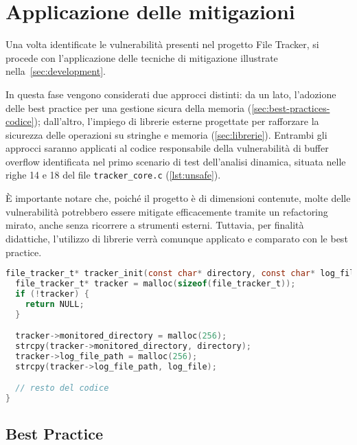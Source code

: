 \section{Applicazione delle mitigazioni}
\label{sec:mitigation_techniques}

Una volta identificate le vulnerabilità presenti nel progetto File Tracker, si
procede con l'applicazione delle tecniche di mitigazione illustrate nella~\autoref{sec:development}.

In questa fase vengono considerati due approcci distinti: da un lato, l'adozione
delle best practice per una gestione sicura della memoria (\autoref{sec:best-practices-codice});
dall'altro, l'impiego di librerie esterne progettate per rafforzare la sicurezza
delle operazioni su stringhe e memoria (\autoref{sec:librerie}). Entrambi gli approcci
saranno applicati al codice responsabile della vulnerabilità di buffer overflow identificata
nel primo scenario di test dell'analisi dinamica, situata nelle righe 14 e 18
del file \texttt{tracker\_core.c} (\autoref{lst:unsafe}).

È importante notare che, poiché il progetto è di dimensioni contenute, molte delle
vulnerabilità potrebbero essere mitigate efficacemente tramite un refactoring mirato,
anche senza ricorrere a strumenti esterni. Tuttavia, per finalità didattiche, l'utilizzo
di librerie verrà comunque applicato e comparato con le best practice.

\bigskip
\begin{lstlisting}[language=C, caption={Codice originale vulnerabile}, label={lst:unsafe}, style=changes_in_c]
file_tracker_t* tracker_init(const char* directory, const char* log_file) {
  file_tracker_t* tracker = malloc(sizeof(file_tracker_t));
  if (!tracker) {
    return NULL;
  }

  tracker->monitored_directory = malloc(256);
  strcpy(tracker->monitored_directory, directory);
  tracker->log_file_path = malloc(256);
  strcpy(tracker->log_file_path, log_file);

  // resto del codice
}
\end{lstlisting}

\subsection*{Best Practice}
\label{sec:best-practices-case-study}

